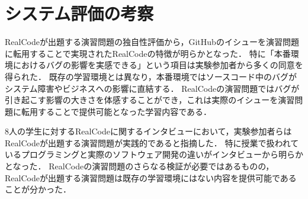 

\section{システム評価の考察}

RealCodeが出題する演習問題の独自性評価から，GitHubのイシューを演習問題に転用することで実現されたRealCodeの特徴が明らかとなった．
特に「本番環境におけるバグの影響を実感できる」という項目は実験参加者から多くの同意を得られた．
既存の学習環境とは異なり，本番環境ではソースコード中のバグがシステム障害やビジネスへの影響に直結する．
RealCodeの演習問題ではバグが引き起こす影響の大きさを体感することができ，これは実際のイシューを演習問題に転用することで提供可能となった学習内容である．



8人の学生に対するRealCodeに関するインタビューにおいて，実験参加者らはRealCodeが出題する演習問題が実践的であると指摘した．
特に授業で扱われているプログラミングと実際のソフトウェア開発の違いがインタビューから明らかとなった．
RealCodeの演習問題のさらなる検証が必要ではあるものの，RealCodeが出題する演習問題は既存の学習環境にはない内容を提供可能であることが分かった．

